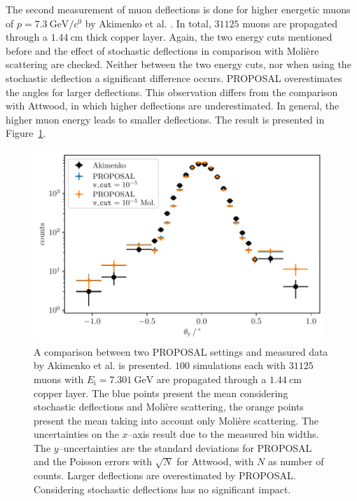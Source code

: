\documentclass[pdflatex, sn-mathphys]{sn-jnl}%
\theoremstyle{thmstyleone}%
\theoremstyle{thmstyletwo}%
\theoremstyle{thmstylethree}%
\begin{document}
The second measurement of muon deflections is done for higher energetic muons 
of $p = \SI[per-mode=symbol]{7.3}{\giga\electronvolt\per\clight}$ by Akimenko et al. \cite{akimenko_1984}.
In total, $\num{31125}$ muons are propagated through a $\SI{1.44}{\centi\meter}$ thick 
copper layer. Again, the two energy cuts mentioned before and the effect of stochastic deflections 
in comparison with Molière scattering are checked. 
Neither between the two energy cuts, nor when using the stochastic deflection a significant difference occurs. 
PROPOSAL overestimates the angles for larger deflections. This observation differs from the comparison with Attwood, 
in which higher deflections are underestimated. In general, the higher muon energy 
leads to smaller deflections. The result is presented in Figure~\ref{fig:akimenko_comparison}.
\begin{figure}
    \centering 
    \includegraphics[width=0.98\textwidth]{../../deflection/plots/FINAL/akimenko_comparison_moliere_E7301MeV_final_multi_mean_deg.pdf}
    \caption{A comparison between two PROPOSAL settings and measured data by Akimenko et al. \cite{akimenko_1984} 
    is presented. $\num{100}$ simulations each with $\num{31125}$ muons with 
    $E_{\mathrm{i}} = \SI{7.301}{\giga\electronvolt}$ are propagated through a $\SI{1.44}{\centi\meter}$ 
    copper layer. The blue points present the mean considering stochastic deflections and Molière scattering, the orange points
    present the mean taking into account only Molière scattering. The uncertainties on the $x$--axis result due to the measured bin widths. The $y$--uncertainties are the standard deviations for PROPOSAL and the Poisson errors with $\sqrt{N}$ for Attwood, with $N$ as number of counts. Larger deflections are overestimated by PROPOSAL.
    Considering stochastic deflections has no significant impact.}
    \label{fig:akimenko_comparison}
\end{figure}
\end{document}
